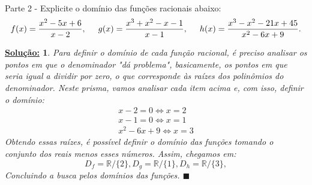 \documentclass{article}
\newtheorem*{sol*}{\underline{Solu\c c\~ao:}}
\renewcommand\qedsymbol{$\blacksquare$}
\begin{document}
\paragraph{} Parte 2 - Explicite o dom\'inio das fun\c c\~oes racionais abaixo:
$$
	f(x) = \frac{x^2 - 5x + 6}{x - 2}, \hspace{0.5cm} g(x) = \frac{x^3 + x^2 - x - 1}{x - 1}, \hspace{0.5cm} h(x) = \frac{x^3 - x^2 - 21x + 45}{x^2 - 6x + 9}.
$$
\begin{sol*}
Para definir o dom\'inio de cada fun\c c\~ao racional, \'e preciso analisar os pontos em que o denominador "d\'a problema", basicamente, os pontos em que seria igual a dividir por zero, o que corresponde \`as ra\'izes dos polin\^omios do denominador. Neste prisma, vamos analisar cada item acima e, com isso, definir o dom\'inio:
\begin{align*}
		x - 2 = 0 \Leftrightarrow x = 2 \\
		x - 1 = 0 \Leftrightarrow x = 1 \\
		x^2 - 6x + 9 \Leftrightarrow x = 3
\end{align*}
Obtendo essas ra\'izes, \'e poss\'ivel definir o dom\'inio das fun\c c\~oes tomando o conjunto dos reais menos esses n\'umeros. Assim, chegamos em:
$$
D_f = \mathbb{R}\slash\{2\}, D_g = \mathbb{R}\slash\{1\}, D_h = \mathbb{R}\slash\{3\},
$$
Concluindo a busca pelos dom\'inios das fun\c c\~oes.
\qedsymbol
\end{sol*}
\end{document}
